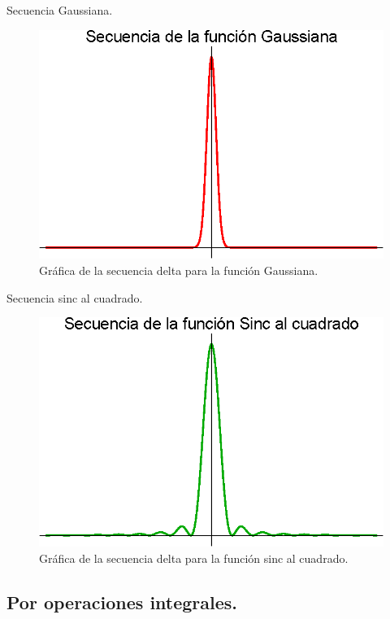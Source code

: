 \documentclass[12pt]{article}
\numberwithin{equation}{section}
\begin{document}
Secuencia Gaussiana.
\begin{figure}[H]
    \centering
    \includegraphics[scale=1]{Imagenes/secuencia_Delta_06.eps}
    \caption{Gráfica de la secuencia delta para la función Gaussiana.}
    \label{fig:figura_05_08}
\end{figure}

Secuencia sinc al cuadrado.
\begin{figure}[H]
    \centering
    \includegraphics[scale=1]{Imagenes/secuencia_Delta_07.eps}
    \caption{Gráfica de la secuencia delta para la función sinc al cuadrado.}
    \label{fig:figura_05_09}
\end{figure}

\subsection{Por operaciones integrales.}
\end{document}
